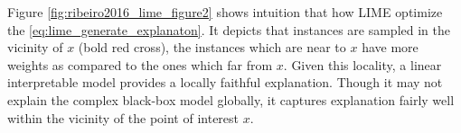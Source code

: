 \documentclass[english]{tktltiki2}
\theoremstyle{definition}
\theoremstyle{remark}
\begin{document}

Figure \ref{fig:ribeiro2016_lime_figure2} shows intuition that how LIME \citep{ribeiro2016should} optimize the \eqref{eq:lime_generate_explanaton}. It depicts that instances are sampled in the vicinity of $x$ (bold red cross), the instances which are near to $x$ have more weights as compared to the ones which far from $x$. Given this locality, a linear interpretable model provides a locally faithful explanation. Though it may not explain the complex black-box model globally, it captures explanation fairly well within the vicinity of the point of interest $x$. 



\end{document}
